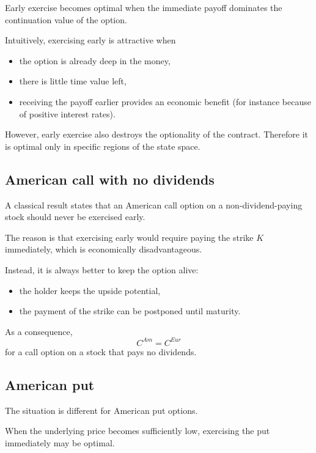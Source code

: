\documentclass[11pt]{article}
\theoremstyle{definition}
\theoremstyle{plain}
\begin{document}
Early exercise becomes optimal when the immediate payoff dominates the
continuation value of the option.

Intuitively, exercising early is attractive when
\begin{itemize}[leftmargin=1.4em]
\item the option is already deep in the money,
\item there is little time value left,
\item receiving the payoff earlier provides an economic benefit
(for instance because of positive interest rates).
\end{itemize}

However, early exercise also destroys the optionality of the contract.
Therefore it is optimal only in specific regions of the state space.

\subsection{American call with no dividends}

A classical result states that an American call option on a
non-dividend-paying stock should never be exercised early.

The reason is that exercising early would require paying the strike
\(K\) immediately, which is economically disadvantageous.

Instead, it is always better to keep the option alive:
\begin{itemize}[leftmargin=1.4em]
\item the holder keeps the upside potential,
\item the payment of the strike can be postponed until maturity.
\end{itemize}

As a consequence,
\[
C^{Am} = C^{Eur}
\]
for a call option on a stock that pays no dividends.

\subsection{American put}

The situation is different for American put options.

When the underlying price becomes sufficiently low, exercising the put
immediately may be optimal.
\end{document}
